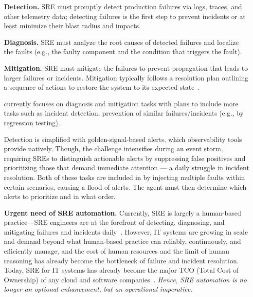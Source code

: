 \vspace{-10pt}
\begin{packed_itemize}
    \item {\bf Detection.} SRE must promptly detect production failures via logs, traces, and other telemetry data; detecting failures is the first step to prevent incidents or at least minimize their blast radius and impacts.  
    \item {\bf Diagnosis.} SRE must analyze the root causes of detected failures and localize the faults (e.g., the faulty component and the condition that triggers the fault). 
    \item {\bf Mitigation.} SRE must mitigate the failures to prevent propagation that leads to larger failures or incidents. Mitigation typically follows a resolution plan outlining a sequence of actions to restore the system to its expected state~\cite{chen:eurosys:24}.
\end{packed_itemize}

\bench currently focuses on diagnosis and mitigation tasks with plans to include more tasks 
    such as incident detection, prevention of similar failures/incidents (e.g., by regression testing).

Detection is simplified with golden-signal-based alerts, which observability tools provide natively. Though, the challenge intensifies during an event storm, requiring SREs to distinguish actionable alerts by suppressing false positives and prioritizing those that demand immediate attention — a daily struggle in incident resolution.
Both of these tasks are included in \bench by injecting multiple faults within certain scenarios, causing a flood of alerts. 
The agent must then determine which alerts to prioritize and in what order.

{\bf Urgent need of SRE automation.}
Currently, SRE is largely a human-based practice---SRE engineers are at the forefront of detecting, diagnosing, and mitigating failures and incidents daily~\cite{Beyer:2018,srehandbook}. 
However, IT systems are growing in scale and demand beyond what
human-based practice can reliably, continuously, and efficiently manage, and the cost of human resources and the limit of human reasoning has already become the bottleneck of failure and incident resolution. Today, SRE for IT systems has already become the major TCO (Total Cost of Ownership) of any cloud and software companies~\cite{Boulton2019, IDCStormClouds2024}.
\textit{Hence, SRE automation is no longer an optional enhancement, but an operational imperative.}

